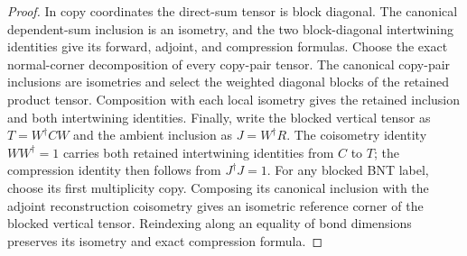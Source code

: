 \begin{proof}\leanok
    In copy coordinates the direct-sum tensor is block diagonal. The
    canonical dependent-sum inclusion is an isometry, and the two
    block-diagonal intertwining identities give its forward, adjoint, and
    compression formulas.
    Choose the exact normal-corner decomposition of every copy-pair tensor.
    The canonical copy-pair inclusions are isometries and select the weighted
    diagonal blocks of the retained product tensor. Composition with each
    local isometry gives the retained inclusion and both intertwining
    identities. Finally, write the blocked vertical tensor as
    $T=W^\dagger CW$ and the ambient inclusion as $J=W^\dagger R$. The
    coisometry identity $WW^\dagger=1$ carries both retained intertwining
    identities from $C$ to $T$; the compression identity then follows from
    $J^\dagger J=1$.
    For any blocked BNT label, choose its first multiplicity copy. Composing
    its canonical inclusion with the adjoint reconstruction coisometry gives
    an isometric reference corner of the blocked vertical tensor. Reindexing
    along an equality of bond dimensions preserves its isometry and exact
    compression formula.
\end{proof}

